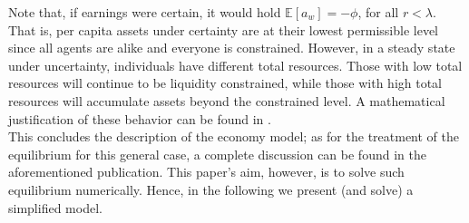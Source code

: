 \documentclass[12pt]{article}
\begin{document}
Note that, if earnings were certain, it would hold $\mathbb E\left[a_w \right] = -\phi$, for all $r < \lambda$. That is, per capita assets under certainty are at their lowest permissible level since all agents are alike and everyone is constrained. However, in a steady state under uncertainty, individuals have different total resources. Those with low total resources will continue to be liquidity constrained, while those with high total resources will accumulate assets beyond the constrained level. A mathematical justification of these behavior can be found in \cite{aiya94}. \\
This concludes the description of the economy model; as for the treatment of the equilibrium for this general case, a complete discussion can be found in the aforementioned publication. This paper's aim, however, is to solve such equilibrium numerically. Hence, in the following we present (and solve) a simplified model.\\
\end{document}
